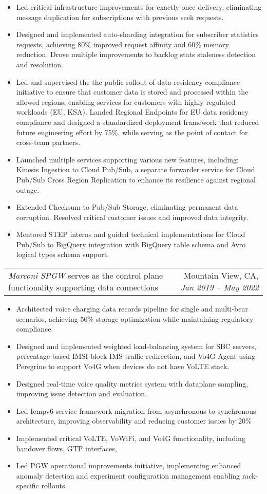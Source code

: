 \documentclass[letterpaper,11pt]{article}
\makeatletter
\newcommand{\resumeItem}[1]{
  \item\small{
    {#1 \vspace{-3pt}}
  }
}
\newcommand{\resumeSubSubheadingMultiteam}[4]{
    \begin{tabular*}{0.97\textwidth}{l@{\extracolsep{\fill}}r}
      \textit{\small#1}{ \scriptsize #4} & {\small#2}\textit{\small, #3} \\
    \end{tabular*}
    \vspace{-8pt}
}
\newcommand{\resumeItemListStart}{\begin{itemize}}
\newcommand{\resumeItemListEnd}{\end{itemize}\vspace{-5pt}}
\makeatother
\begin{document}
      \resumeItemListStart
\resumeItem{Led critical infrastructure improvements for exactly-once delivery, eliminating message duplication for subscriptions with previous seek requests.}
\resumeItem{Designed and implemented auto-sharding integration for subscriber statistics requests, achieving 80\% improved request affinity and 60\% memory reduction. Drove multiple improvements to backlog stats staleness detection and resolution.}
\resumeItem{Led and supervised the the public rollout of data residency compliance initiative to ensure that customer data is stored and processed 
within the allowed regions, enabling services for customers with highly regulated workloads (EU, KSA). 
Landed Regional Endpoints for EU data residency compliance and 
designed a standardized deployment framework that reduced future engineering effort by 75\%, 
while serving as the point of contact for cross-team partners.}
\resumeItem{Launched multiple services supporting various new features, including: Kinesis Ingestion to Cloud Pub/Sub, a separate forwarder service for Cloud Pub/Sub Cross Region Replication to enhance its resilience against regional outage.}
\resumeItem{Extended Checksum to Pub/Sub Storage, eliminating permanent data corruption. Resolved critical customer issues and improved data integrity.}
\resumeItem{Mentored STEP interns and guided technical implementations for Cloud Pub/Sub to BigQuery integration with BigQuery table schema and Avro logical types schema support.}
      \resumeItemListEnd

  \resumeSubSubheadingMultiteam
   {Marconi SPGW}{Mountain View, CA}{Jan 2019 -- May 2022}
   {serves as the control plane functionality supporting data connections}

      \resumeItemListStart
\resumeItem{Architected voice charging data records pipeline for single and multi-bear scenarios, achieving 50\% storage optimization while maintaining regulatory compliance.}
\resumeItem{Designed and implemented weighted load-balancing system for SBC servers, percentage-based IMSI-block IMS traffic redirection, and Vo4G Agent using Peregrine to support Vo4G when devices do not have VoLTE stack.}
\resumeItem{Designed real-time voice quality metrics system with dataplane sampling, improving issue detection and evaluation.} %
\resumeItem{Led Icmpv6 service framework migration from asynchronous to synchronous architecture, improving observability and reducing customer issues by 20\%}
\resumeItem{Implemented critical VoLTE, VoWiFi, and Vo4G functionality, including handover flows, GTP interfaces, }
\resumeItem{Led PGW operational improvements initiative, implementing enhanced anomaly detection and experiment configuration management enabling rack-specific rollouts.}
      \resumeItemListEnd
\end{document}
